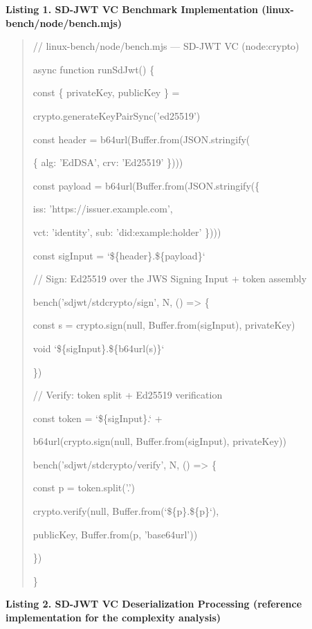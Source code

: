 \documentclass[conference]{IEEEtran}
\begin{document}
\textbf{Listing 1. SD-JWT VC Benchmark Implementation (linux-bench/node/bench.mjs)}

\begin{quote}
// linux-bench/node/bench.mjs --- SD-JWT VC (node:crypto)

async function runSdJwt() \{

const \{ privateKey, publicKey \} =

crypto.generateKeyPairSync('ed25519')

const header = b64url(Buffer.from(JSON.stringify(

\{ alg: 'EdDSA', crv: 'Ed25519' \})))

const payload = b64url(Buffer.from(JSON.stringify(\{

iss: 'https://issuer.example.com',

vct: 'identity', sub: 'did:example:holder' \})))

const sigInput = `\$\{header\}.\$\{payload\}`

// Sign: Ed25519 over the JWS Signing Input + token assembly

bench('sdjwt/stdcrypto/sign', N, () =\textgreater{} \{

const s = crypto.sign(null, Buffer.from(sigInput), privateKey)

void `\$\{sigInput\}.\$\{b64url(s)\}`

\})

// Verify: token split + Ed25519 verification

const token = `\$\{sigInput\}.` +

b64url(crypto.sign(null, Buffer.from(sigInput), privateKey))

bench('sdjwt/stdcrypto/verify', N, () =\textgreater{} \{

const p = token.split('.')

crypto.verify(null, Buffer.from(`\$\{p\cite{ref0}\}.\$\{p\cite{ref1}\}`),

publicKey, Buffer.from(p\cite{ref2}, 'base64url'))

\})

\}
\end{quote}

\textbf{Listing 2. SD-JWT VC Deserialization Processing (reference implementation for the complexity analysis)}
\end{document}
